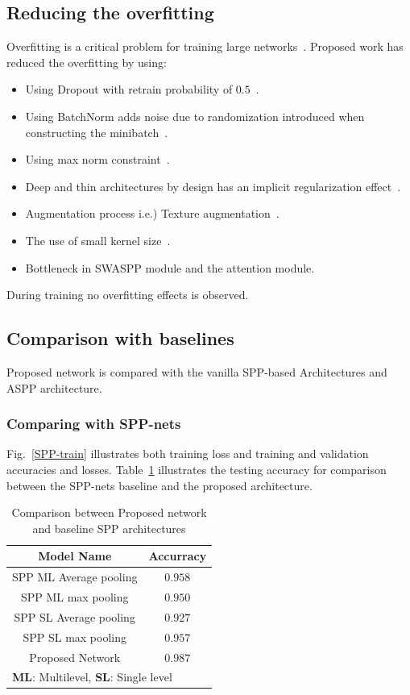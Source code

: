 \subsection{Reducing the overfitting}
Overfitting is a critical problem for training large networks~\cite{krizhevsky2012imagenet}. Proposed work has reduced the overfitting by using:
\begin{itemize}
\item Using Dropout with retrain probability of $0.5$~\cite{srivastava2014dropout}.
\item Using BatchNorm adds noise due to randomization introduced when constructing the minibatch~\cite{ioffe2015batch}.
\item Using max norm constraint~\cite{krizhevsky2012imagenet}.
\item Deep and thin architectures by design has an implicit regularization effect~\cite{he2016deep}. 
\item Augmentation process i.e.) Texture augmentation~\cite{krizhevsky2012imagenet}. 
\item The use of small kernel size~\cite{simonyan2014very}.
\item Bottleneck in SWASPP module and the attention module.
\end{itemize}
During training no overfitting effects is observed.
\subsection{Comparison with baselines}
Proposed network is compared with the vanilla SPP-based Architectures and ASPP architecture.
\subsubsection{Comparing with SPP-nets}
Fig.~\ref{SPP-train} illustrates both training loss and training and validation accuracies and losses. Table~\ref{blaccom} illustrates the testing accuracy for comparison between the SPP-nets baseline and the proposed architecture.
\begin{table}[htbp]
\caption{Comparison between Proposed network and baseline SPP architectures }
\begin{center}
\begin{tabular}{|c|c|}
\hline
\textbf{Model Name}& Accurracy \\
\hline
 SPP ML Average pooling & $0.958$   \\
\hline
SPP ML max pooling & $0.950$   \\
\hline
  SPP SL Average pooling & $0.927$   \\
\hline
  SPP SL max pooling & $0.957$ \\
\hline
Proposed Network & $0.987$\\
\hline
\multicolumn{2}{l}{ \textbf{ML}: Multilevel, \textbf{SL}: Single level}
\end{tabular}
\label{blaccom}
\end{center}
\end{table}
